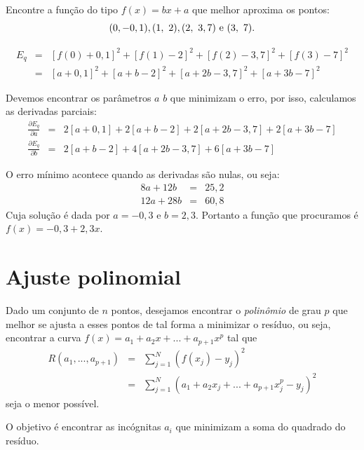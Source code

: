 \begin{ex}Encontre a função do tipo $f(x)=bx+a$ que melhor aproxima os pontos:
  \begin{equation*}
    (0,-0,1), (1,~2), (2,~3,7) ~ \hbox{e} ~(3,~7).  
  \end{equation*}
\end{ex}
\begin{sol}
\begin{eqnarray*}
E_q&=&[f(0)+0,1]^2+[f(1)-2]^2+[f(2)-3,7]^2+[f(3)-7]^2\\
&=&[a+0,1]^2+[a+b-2]^2+[a+2b-3,7]^2+[a+3b-7]^2
\end{eqnarray*}

Devemos encontrar os parâmetros $a$ $b$ que minimizam o erro, por isso, calculamos as derivadas parciais:
\begin{eqnarray*}
\frac{\partial E_q}{\partial a}&=&2[a+0,1]+2[a+b-2]+2[a+2b-3,7]+2[a+3b-7]\\
\frac{\partial E_q}{\partial b}&=&2[a+b-2]+4[a+2b-3,7]+6[a+3b-7]
\end{eqnarray*}



O erro mínimo acontece quando as derivadas são nulas, ou seja:
\begin{eqnarray*}
8a+12b&=&25,2\\
12a+28b&=&60,8
\end{eqnarray*}
Cuja solução é dada por $a=-0,3$ e $b=2,3$.
Portanto a função que procuramos é $f(x)=-0,3 +2,3x$.  
\end{sol}


\section{Ajuste polinomial}

Dado um conjunto de $n$ pontos, desejamos encontrar o \textit{polinômio} de grau $p$ que melhor se ajusta a esses pontos de tal forma a minimizar o resíduo, ou seja, encontrar a curva $f(x)=a_1+a_2 x+...+a_{p+1}x^{p}$ tal que 
\begin{eqnarray*}
  R(a_1,...,a_{p+1}) &=&\sum_{j=1}^N (f(x_j)-y_j)^2 \\
                 &=&\sum_{j=1}^N (a_1 + a_2 x_j+...+a_{p+1}x_j^p-y_j)^2
\end{eqnarray*}
seja o menor possível.

O objetivo é encontrar as incógnitas $a_i$ que minimizam a soma do quadrado do resíduo.

